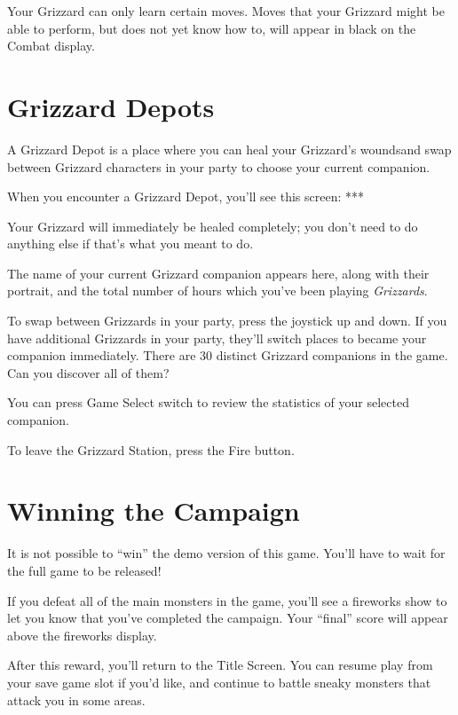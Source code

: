 \documentclass[12pt,twoside,openright,book]{memoir}
\begin{document}
Your Grizzard  can only  learn certain moves.  Moves that  your Grizzard
might be able to  perform, but does not yet know how  to, will appear in
black on the Combat display.

\section{Grizzard Depots}\label{Grizzard Depots}

A  Grizzard  Depot  is  a  place where  you  can  heal  your  Grizzard's
wounds\ifdef\DEMO\else  and swap  between  Grizzard  characters in  your
party to choose your current companion\fi.

When you encounter a Grizzard Depot, you'll see this screen: ***

Your Grizzard will  immediately be healed completely; you  don't need to
do anything else if that's what you meant to do.

The name  of your  current Grizzard companion  appears here,  along with
their  portrait,  and  the  total  number of  hours  which  you've  been
playing \textit{Grizzards}.

\ifdef\DEMO\else
To swap between Grizzards in your party, press the joystick up and down.
If you have additional Grizzards in your party, they'll switch places to
became  your  companion  immediately.  There are  30  distinct  Grizzard
companions in the game. Can you discover all of them?
\fi

You  can press  Game  Select switch  to review  the  statistics of  your
selected companion.

To leave the Grizzard Station, press the Fire button.


\section{Winning the Campaign}\label{Winning the Campaign}

\ifdef\DEMO

It is not possible to ``win'' the demo version of this game. You'll have
to wait for the full game to be released!

\else

If  you  defeat  all of  the  main  monsters  in  the game,  you'll  see
a fireworks  show to let  you know  that you've completed  the campaign.
Your ``final'' score will appear above the fireworks display.

After this  reward, you'll return  to the  Title Screen. You  can resume
play from  your save  game slot  if you'd like,  and continue  to battle
sneaky monsters that attack you in some areas.
\end{document}
